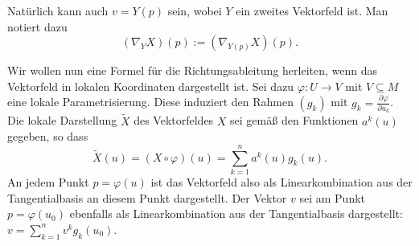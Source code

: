 \noindent
Natürlich kann auch $v=Y(p)$ sein, wobei $Y$ ein zweites Vektorfeld
ist. Man notiert dazu
\begin{equation}
(\nabla_Y X)(p) := (\nabla_{Y(p)} X)(p).
\end{equation}

\noindent
Wir wollen nun eine Formel für die Richtungsableitung herleiten,
wenn das Vektorfeld in lokalen Koordinaten dargestellt ist. Sei
dazu $\varphi\colon U\to V$ mit $V\subseteq M$ eine lokale
Parametrisierung. Diese induziert den Rahmen $(g_k)$ mit
$g_k = \frac{\partial\varphi}{\partial u_k}$. Die lokale
Darstellung $\tilde X$ des Vektorfeldes $X$ sei gemäß den
Funktionen $a^k(u)$ gegeben, so dass%
\begin{equation}
\tilde X(u) = (X\circ\varphi)(u) = \sum_{k=1}^n a^k(u)g_k(u).
\end{equation}
An jedem Punkt $p=\varphi(u)$ ist das Vektorfeld also als
Linearkombination aus der Tangentialbasis an diesem Punkt dargestellt.
Der Vektor $v$ sei am Punkt $p=\varphi(u_0)$ ebenfalls als
Linearkombination aus der Tangentialbasis dargestellt:
$v = \sum_{k=1}^n v^k g_k(u_0)$.

